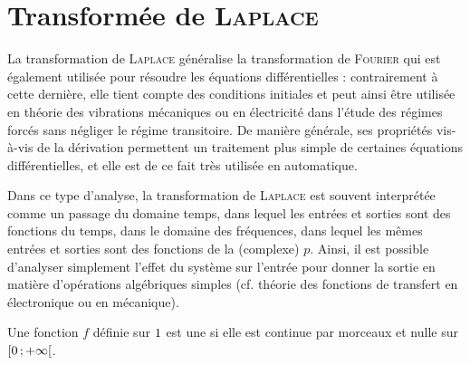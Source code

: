 \section{Transformée de \textsc{Laplace}} 
\label{transformee_laplace}


La transformation de \textsc{Laplace} généralise la transformation de \textsc{Fourier} qui est également utilisée pour résoudre les équations différentielles : contrairement à cette dernière, elle tient compte des conditions initiales et peut ainsi être utilisée en théorie des vibrations mécaniques ou en électricité dans l'étude des régimes forcés sans négliger le régime transitoire. De manière générale, ses propriétés vis-à-vis de la dérivation permettent un traitement plus simple de certaines équations différentielles, et elle est de ce fait très utilisée en automatique.

Dans ce type d'analyse, la transformation de \textsc{Laplace} est souvent interprétée comme un passage du domaine temps, dans lequel les entrées et sorties sont des fonctions du temps, dans le domaine des fréquences, dans lequel les mêmes entrées et sorties sont des fonctions de la  (complexe) $p$. Ainsi, il est possible d'analyser simplement l'effet du système sur l'entrée pour donner la sortie en matière d'opérations algébriques simples (cf. théorie des fonctions de transfert en électronique ou en mécanique). 

\begin{defi}
\begin{comment}
\begin{itemize}
    \item On appelle \definir{fonction causale} une fonction définie sur $\R$ dont le support est borné à gauche en $0$ \emph{i.e.} $f$ est nulle pour tout $x < 0$. 
    \item On appelle fonction causale toute fonction définie sur $\R$, nulle sur $\interoo{-\infty}{0}$ et continue par morceaux sur $\interfo{0}{+\infty}$.
\end{itemize}
\end{comment}
Une fonction $f$ définie sur $1$ est une  si elle est continue par morceaux et nulle sur $\left[0\,;+\infty\right[$.
\end{defi}


